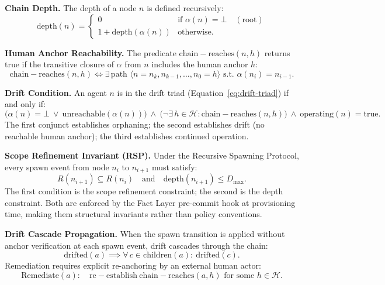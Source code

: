 \medskip
\noindent\textbf{Chain Depth.}
The depth of a node $n$ is defined recursively:
\begin{equation}
\mathrm{depth}(n) = 
\begin{cases}
0 & \text{if } \alpha(n) = \bot \quad (\text{root}) \\
1 + \mathrm{depth}(\alpha(n)) & \text{otherwise}.
\end{cases}
\label{eq:depth}
\end{equation}

\medskip
\noindent\textbf{Human Anchor Reachability.}
The predicate $\mathrm{chain-reaches}(n, h)$ returns true if the transitive closure of $\alpha$ from $n$ includes the human anchor $h$:
\begin{equation}
\mathrm{chain-reaches}(n, h) \iff \exists\, \text{path } \langle n = n_k, n_{k-1}, \ldots, n_0 = h \rangle \text{ s.t. } \alpha(n_i) = n_{i-1}.
\label{eq:chain-reaches}
\end{equation}

\medskip
\noindent\textbf{Drift Condition.}
An agent $n$ is in the drift triad (Equation~\ref{eq:drift-triad}) if and only if:
\begin{equation}
\bigl( \alpha(n) = \bot \ \lor \ \mathrm{unreachable}(\alpha(n)) \bigr)\ \land\ \bigl( \neg\exists\, h \in \mathcal{H} : \mathrm{chain-reaches}(n, h) \bigr)\ \land\ \mathrm{operating}(n) = \mathrm{true}.
\label{eq:drift-condition}
\end{equation}
The first conjunct establishes orphaning; the second establishes drift (no reachable human anchor); the third establishes continued operation.

\medskip
\noindent\textbf{Scope Refinement Invariant (RSP).}
Under the Recursive Spawning Protocol, every spawn event from node $n_i$ to $n_{i+1}$ must satisfy:
\begin{equation}
R(n_{i+1}) \subseteq R(n_i) \quad \text{and} \quad \mathrm{depth}(n_{i+1}) \leq D_{\max}.
\label{eq:scope-refinement}
\end{equation}
The first condition is the scope refinement constraint; the second is the depth constraint. Both are enforced by the Fact Layer pre-commit hook at provisioning time, making them structural invariants rather than policy conventions.

\medskip
\noindent\textbf{Drift Cascade Propagation.}
When the spawn transition is applied without anchor verification at each spawn event, drift cascades through the chain:
\begin{equation}
\mathrm{drifted}(a) \implies \forall\, c \in \mathrm{children}(a):\ \mathrm{drifted}(c).
\label{eq:drift-propagation}
\end{equation}
Remediation requires explicit re-anchoring by an external human actor:
\begin{equation}
\mathrm{Remediate}(a):\quad \mathrm{re-establish}\ \mathrm{chain-reaches}(a, h) \text{ for some } h \in \mathcal{H}.
\label{eq:drift-remediation}
\end{equation}

